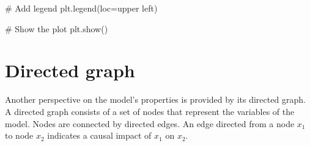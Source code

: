 \documentclass[
  letterpaper,
  DIV=11,
  numbers=noendperiod]{scrreprt}
\newenvironment{Shaded}{\begin{snugshade}}{\end{snugshade}}
\newcommand{\CommentTok}[1]{\textcolor[rgb]{0.37,0.37,0.37}{#1}}
\newcommand{\NormalTok}[1]{\textcolor[rgb]{0.00,0.23,0.31}{#1}}
\newcommand{\OperatorTok}[1]{\textcolor[rgb]{0.37,0.37,0.37}{#1}}
\newcommand{\StringTok}[1]{\textcolor[rgb]{0.13,0.47,0.30}{#1}}
\begin{document}
\begin{tcolorbox}
\begin{Shaded}
\begin{Highlighting}[]
\CommentTok{\# Add legend}
\NormalTok{plt.legend(loc}\OperatorTok{=}\StringTok{\textquotesingle{}upper left\textquotesingle{}}\NormalTok{)}

\CommentTok{\# Show the plot}
\NormalTok{plt.show()}
\end{Highlighting}
\end{Shaded}

\end{tcolorbox}

\section{Directed graph}\label{directed-graph-12}

Another perspective on the model's properties is provided by its
directed graph. A directed graph consists of a set of nodes that
represent the variables of the model. Nodes are connected by directed
edges. An edge directed from a node \(x_1\) to node \(x_2\) indicates a
causal impact of \(x_1\) on \(x_2\).
\end{document}
